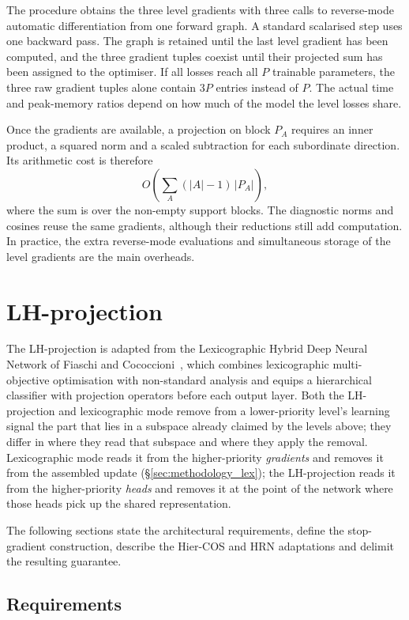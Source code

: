 The procedure obtains the three level gradients with three calls to
reverse-mode automatic differentiation from one forward graph. A standard
scalarised step uses one backward pass. The graph is retained until the last
level gradient has been computed, and the three gradient tuples coexist until
their projected sum has been assigned to the optimiser. If all losses reach all
$P$ trainable parameters, the three raw gradient tuples alone contain $3P$
entries instead of $P$.
The actual time and peak-memory ratios depend on how much of the model the level
losses share.

Once the gradients are available, a projection on block $P_A$ requires an inner
product, a squared norm and a scaled subtraction for each subordinate direction.
Its arithmetic cost is therefore
\[
O\!\left(\sum_{A} (|A|-1)\,|P_A|\right),
\]
where the sum is over the non-empty support blocks. The diagnostic norms and cosines reuse
the same gradients, although their reductions still add computation. In
practice, the extra reverse-mode evaluations and simultaneous storage of the
level gradients are the main overheads.

\section{LH-projection}
\label{sec:methodology_lhproj}

The LH-projection is adapted from the Lexicographic Hybrid Deep Neural Network
of Fiaschi and Cococcioni~\cite{fiaschi2024informed}, which combines lexicographic multi-objective
optimisation with non-standard analysis
\cite{benci2022nonstandard,benci2019measure} and equips a hierarchical classifier
with projection operators before each output layer. Both the LH-projection and lexicographic mode remove from a lower-priority
level's learning signal the part that lies in a subspace already claimed by the
levels above; they differ in where they read that subspace and where they apply
the removal. Lexicographic mode reads it from the higher-priority
\emph{gradients} and removes it from the assembled update
(\S\ref{sec:methodology_lex}); the LH-projection reads it from the higher-priority
\emph{heads} and removes it at the point of the network where those heads pick up
the shared representation.

The following sections state the
architectural requirements, define the stop-gradient construction, describe the
Hier-COS and HRN adaptations and delimit the resulting guarantee.

\subsection{Requirements}
\label{ssec:lhproj_setting}

